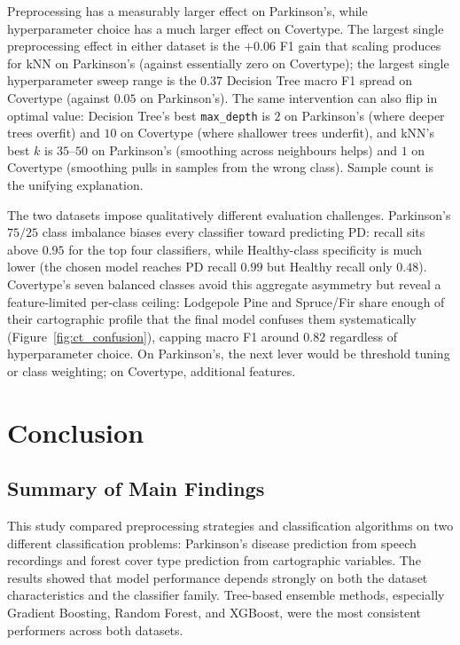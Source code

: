 \documentclass[11pt,a4paper]{article}
\begin{document}
Preprocessing has a measurably larger effect on Parkinson's, while
hyperparameter choice has a much larger effect on Covertype. The largest
single preprocessing effect in either dataset is the $+0.06$ F1 gain that
scaling produces for kNN on Parkinson's (against essentially zero on
Covertype); the largest single hyperparameter sweep range is the $0.37$
Decision Tree macro F1 spread on Covertype (against $0.05$ on Parkinson's).
The same intervention can also flip in optimal value: Decision Tree's best
\texttt{max\_depth} is $2$ on Parkinson's (where deeper trees overfit) and
$10$ on Covertype (where shallower trees underfit), and kNN's best $k$ is
$35\text{--}50$ on Parkinson's (smoothing across neighbours helps) and $1$
on Covertype (smoothing pulls in samples from the wrong class). Sample
count is the unifying explanation.

The two datasets impose qualitatively different evaluation challenges.
Parkinson's $75/25$ class imbalance biases every classifier toward
predicting PD: recall sits above $0.95$ for the top four classifiers, while
Healthy-class specificity is much lower (the chosen model reaches PD recall
$0.99$ but Healthy recall only $0.48$). Covertype's seven balanced classes
avoid this aggregate asymmetry but reveal a feature-limited per-class
ceiling: Lodgepole Pine and Spruce/Fir share enough of their cartographic
profile that the final model confuses them systematically
(Figure~\ref{fig:ct_confusion}), capping macro F1 around $0.82$ regardless
of hyperparameter choice. On Parkinson's, the next lever would be threshold
tuning or class weighting; on Covertype, additional features.

\section{Conclusion}\label{sec:conclusion}

\subsection{Summary of Main Findings}

This study compared preprocessing strategies and classification algorithms
on two different classification problems: Parkinson's disease prediction
from speech recordings and forest cover type prediction from cartographic
variables. The results showed that model performance depends strongly on
both the dataset characteristics and the classifier family. Tree-based
ensemble methods, especially Gradient Boosting, Random Forest, and XGBoost,
were the most consistent performers across both datasets.
\end{document}

